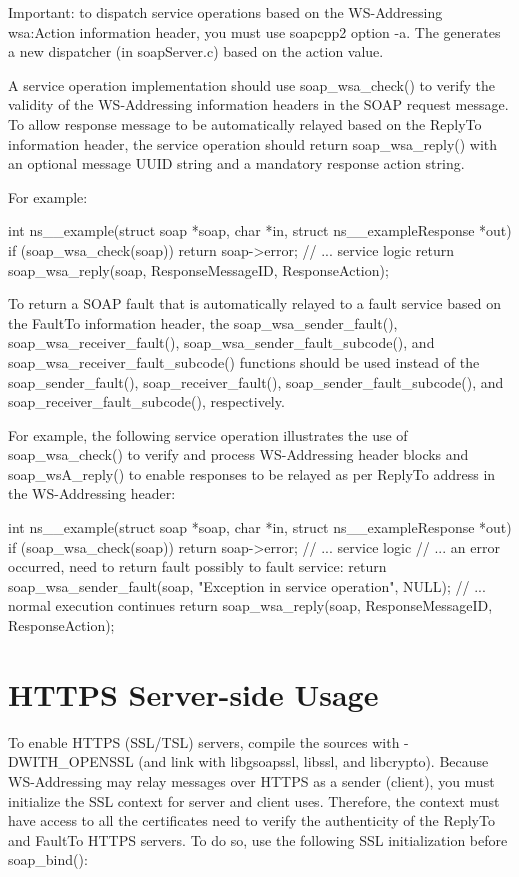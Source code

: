 Important: to dispatch service operations based on the WS-\/Addressing wsa:Action information header, you must use soapcpp2 option -\/a. The generates a new dispatcher (in soapServer.c) based on the action value.

A service operation implementation should use soap\_\-wsa\_\-check() to verify the validity of the WS-\/Addressing information headers in the SOAP request message. To allow response message to be automatically relayed based on the ReplyTo information header, the service operation should return soap\_\-wsa\_\-reply() with an optional message UUID string and a mandatory response action string.

For example:


\begin{DoxyCode}
int ns__example(struct soap *soap, char *in, struct ns__exampleResponse *out)
{ if (soap_wsa_check(soap))
    return soap->error;
  // ... service logic
  return soap_wsa_reply(soap, ResponseMessageID, ResponseAction);
}
\end{DoxyCode}


To return a SOAP fault that is automatically relayed to a fault service based on the FaultTo information header, the soap\_\-wsa\_\-sender\_\-fault(), soap\_\-wsa\_\-receiver\_\-fault(), soap\_\-wsa\_\-sender\_\-fault\_\-subcode(), and soap\_\-wsa\_\-receiver\_\-fault\_\-subcode() functions should be used instead of the soap\_\-sender\_\-fault(), soap\_\-receiver\_\-fault(), soap\_\-sender\_\-fault\_\-subcode(), and soap\_\-receiver\_\-fault\_\-subcode(), respectively.

For example, the following service operation illustrates the use of soap\_\-wsa\_\-check() to verify and process WS-\/Addressing header blocks and soap\_\-wsA\_\-reply() to enable responses to be relayed as per ReplyTo address in the WS-\/Addressing header:


\begin{DoxyCode}
int ns__example(struct soap *soap, char *in, struct ns__exampleResponse *out)
{ if (soap_wsa_check(soap))
    return soap->error;
  // ... service logic
  // ... an error occurred, need to return fault possibly to fault service:
    return soap_wsa_sender_fault(soap, "Exception in service operation", NULL);
  // ... normal execution continues
  return soap_wsa_reply(soap, ResponseMessageID, ResponseAction);
}
\end{DoxyCode}
\hypertarget{wsa__0_wsa_4}{}\section{HTTPS Server-\/side Usage}\label{wsa__0_wsa_4}
To enable HTTPS (SSL/TSL) servers, compile the sources with -\/DWITH\_\-OPENSSL (and link with libgsoapssl, libssl, and libcrypto). Because WS-\/Addressing may relay messages over HTTPS as a sender (client), you must initialize the SSL context for server and client uses. Therefore, the context must have access to all the certificates need to verify the authenticity of the ReplyTo and FaultTo HTTPS servers. To do so, use the following SSL initialization before soap\_\-bind():


